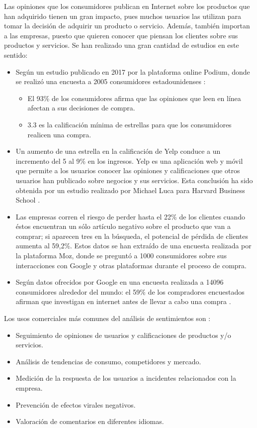 Las opiniones que los consumidores publican en Internet sobre los productos que han adquirido tienen un gran impacto, pues muchos usuarios las utilizan para tomar la decisión de adquirir un producto o servicio. Además, también importan a las empresas, puesto que quieren conocer que piensan los clientes sobre sus productos y servicios. Se han realizado una gran cantidad de estudios en este sentido:
\begin{itemize}
    \item Según un estudio publicado en 2017 por la plataforma online Podium, donde se realizó una encuesta a 2005 consumidores estadounidenses :
    \begin{itemize}
        \item El 93\% de los consumidores afirma que las opiniones que leen en línea afectan a sus decisiones de compra.
        \item 3.3 es la calificación mínima de estrellas para que los consumidores realicen una compra.
    \end{itemize}
    \item Un aumento de una estrella en la calificación de Yelp conduce a un incremento del 5 al 9\% en los ingresos. Yelp es una aplicación web y móvil que permite a los usuarios conocer las opiniones y calificaciones que otros usuarios han publicado sobre negocios y sus servicios. Esta conclusión ha sido obtenida por un estudio realizado por Michael Luca para Harvard Business School \cite{yelp}.
    \item Las empresas corren el riesgo de perder hasta el 22\% de los clientes cuando éstos encuentran un sólo artículo negativo sobre el producto que van a comprar; si aparecen tres en la búsqueda, el potencial de pérdida de clientes aumenta al 59,2\%. Estos datos se han extraído de una encuesta realizada por la plataforma Moz, donde se preguntó a 1000 consumidores sobre sus interacciones con Google y otras plataformas durante el proceso de compra.
    \item Según datos ofrecidos por Google en una encuesta realizada a 14096 consumidores alrededor del mundo: el 59\% de los compradores encuestados afirman que investigan en internet antes de llevar a cabo una compra .
\end{itemize}

Los usos comerciales más comunes del análisis de sentimientos son \cite{mejova}:
\begin{itemize}
    \item Seguimiento de opiniones de usuarios y calificaciones de productos y/o servicios.
    \item Análisis de tendencias de consumo, competidores y mercado.
    \item Medición de la respuesta de los usuarios a incidentes relacionados con la empresa.
    \item Prevención de efectos virales negativos.
    \item Valoración de comentarios en diferentes idiomas.
\end{itemize}

